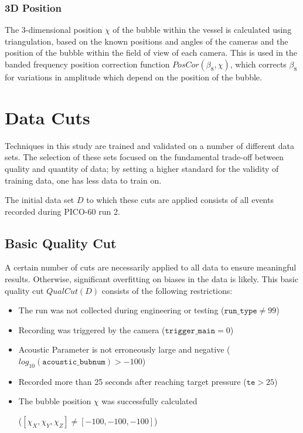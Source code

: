\documentclass[10pt]{article}
\begin{document}
\subsubsection{3D Position}

The 3-dimensional position $\chi$ of the bubble within the vessel is calculated using triangulation, based on the known positions and angles of the cameras and the position of the bubble within the field of view of each camera. This is used in the banded frequency position correction function $PosCor(\beta _{8}, \chi)$, which corrects $\beta _{8}$ for variations in amplitude which depend on the position of the bubble.

\section{Data Cuts}

Techniques in this study are trained and validated on a number of different data sets. The selection of these sets focused on the fundamental trade-off between quality and quantity of data; by setting a higher standard for the validity of training data, one has less data to train on.

The initial data set $D$ to which these cuts are applied consists of all events recorded during PICO-60 run 2.

\subsection{Basic Quality Cut}

A certain number of cuts are necessarily applied to all data to ensure meaningful results. Otherwise, significant overfitting on biases in the data is likely. This basic quality cut $QualCut(D)$ consists of the following restrictions:

\begin{itemize}
    \item The run was not collected during engineering or testing ($\texttt{run\_type}\neq99$)
    \item Recording was triggered by the camera ($\texttt{trigger\_main}=0$)
    \item Acoustic Parameter is not erroneously large and negative ($log_{10}(\texttt{acoustic\_bubnum})>-100$)
    \item Recorded more than 25 seconds after reaching target pressure ($\texttt{te}>25$)
    \item The bubble position $\chi$ was successfully calculated

    ($[\chi_{X}, \chi_{Y}, \chi_{Z}]\neq[-100, -100, -100]$)
\end{itemize}
\end{document}
